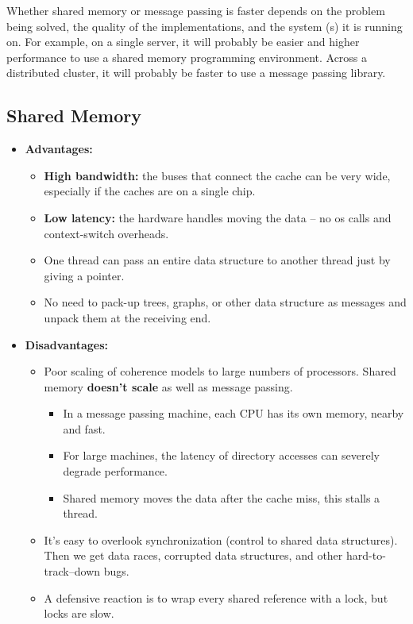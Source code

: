 \documentclass[../main.tex]{subfiles}
\begin{document}
Whether shared memory or message passing is faster depends on the problem being solved, the quality of the implementations, and the system (s) it is running on. For example, on a single server, it will probably be easier and higher performance to use a shared memory programming environment. Across a distributed cluster, it will probably be faster to use a message passing library.

\subsection{Shared Memory}

\begin{itemize}
	\item \textbf{Advantages:}
	      \begin{itemize}
		      \item \textbf{High bandwidth:} the buses that connect the cache can be very wide, especially if the caches are on a single chip.
		      \item \textbf{Low latency:} the hardware handles moving the data -- no os calls and context-switch overheads.
		      \item One thread can pass an entire data structure to another thread just by giving a pointer.
		      \item No need to pack-up trees, graphs, or other data structure as messages and unpack them at the receiving end.
	      \end{itemize}
	\item \textbf{Disadvantages:}
	      \begin{itemize}
		      \item   {
		            Poor scaling of coherence models to large numbers of processors.
		            Shared memory \textbf{doesn't scale} as well as message passing.
		            \begin{itemize}
			            \item In a message passing machine, each CPU has its own memory, nearby and fast.
			            \item For large machines, the latency of directory accesses can severely degrade performance.
			            \item Shared memory moves the data after the cache miss, this stalls a thread.
		            \end{itemize}
		            }
		      \item It's easy to overlook synchronization (control to shared data structures). Then we get data races, corrupted data structures, and other hard-to-track--down bugs.
		      \item A defensive reaction is to wrap every shared reference with a lock, but locks are slow.
	      \end{itemize}
\end{itemize}
\end{document}
